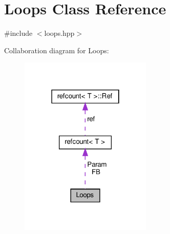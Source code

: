 \hypertarget{classLoops}{}\section{Loops Class Reference}
\label{classLoops}


{\ttfamily \#include $<$loops.\+hpp$>$}



Collaboration diagram for Loops\+:
\nopagebreak
\begin{figure}[H]
\begin{center}
\leavevmode
\includegraphics[width=178pt]{d1/d30/classLoops__coll__graph}
\end{center}
\end{figure}
